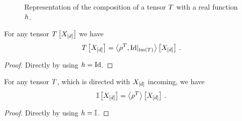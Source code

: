 \begin{figure}[h]
\begin{center}
	
\end{center}
\caption{Representation of the composition of a tensor $T$ with a real function $h$.}
\label{fig:tensorFunctionComposition} 
\end{figure}


\begin{corollary}\label{cor:rhoToNormal}
	For any tensor $T\left[X_{[d]}\right]$ we have
		\[ T\left[X_{[d]}\right] = \left\langle \rho^{T},{\mathrm{Id}}|_{\mathrm{im}\left(T\right)}\right\rangle \left[ X_{[d]} \right] \, . \]
\end{corollary}
\begin{proof}
	Directly by using $h=\mathrm{Id}$.
\end{proof}


\begin{corollary}\label{cor:onesHead}
	For any tensor $T$, which is directed with $X_{[d]}$ incoming, we have
		\[ \mathbb{I}\left[X_{[d]}\right] = \left\langle \rho^{T}\right\rangle \left[ X_{[d]} \right] \, . \]
\end{corollary}
\begin{proof}
	Directly by using $h=\mathbb{I}$.
\end{proof}

